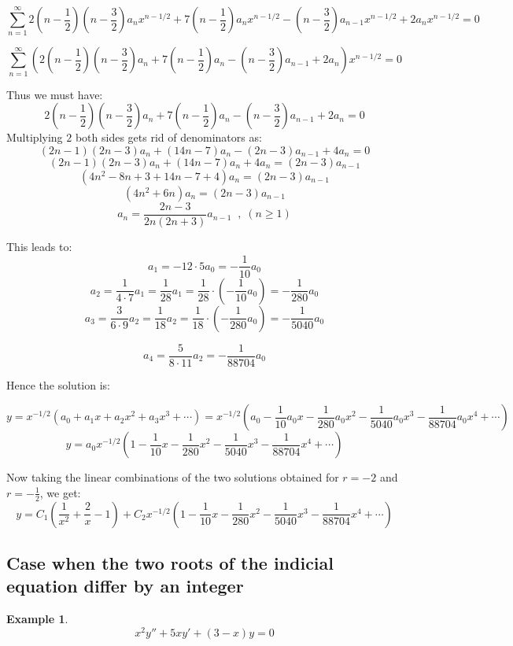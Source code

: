 \documentclass[12pt]{report}
\newtheorem{ex}{Example}[section]
\begin{document}
$$\sum_{n=1}^{\infty} 2\left(n-\frac{1}{2} \right)\left(n-\frac{3}{2} \right) a_n x^{n-1/2} +   7\left(n-\frac{1}{2} \right) a_n x^{n-1/2} -  \left(n-\frac{3}{2} \right) a_{n-1} x^{n-1/2} + 2a_n x^{n-1/2} = 0$$

$$\sum_{n=1}^{\infty} \left( 2\left(n-\frac{1}{2} \right)\left(n-\frac{3}{2} \right) a_n +   7\left(n-\frac{1}{2} \right) a_n -  \left(n-\frac{3}{2} \right) a_{n-1}  + 2a_n \right) x^{n-1/2} = 0$$

Thus we must have:
$$ 2\left(n-\frac{1}{2} \right)\left(n-\frac{3}{2} \right) a_n +   7\left(n-\frac{1}{2} \right) a_n -  \left(n-\frac{3}{2} \right) a_{n-1}  + 2a_n   = 0$$
Multiplying $2$ both sides gets rid of denominators as:
$$ (2n-1)(2n-3)a_n +   (14n-7) a_n -  (2n-3) a_{n-1}  + 4a_n   = 0$$
$$ (2n-1)(2n-3)a_n +   (14n-7) a_n  + 4a_n   =  (2n-3) a_{n-1}$$
$$ \left( 4n^2 -8n + 3 +14n -7 + 4 \right) a_n = (2n-3) a_{n-1}$$
$$ \left( 4n^2 +6n  \right) a_n = (2n-3) a_{n-1}$$
$$ a_n = \frac{2n-3}{2n(2n+3)} a_{n-1} \; \; , \; (n\geq 1)$$

This leads to:
$$ a_1 = {-1}{2\cdot 5} a_0= -\frac{1}{10} a_0 $$
$$ a_2 = \frac{1}{4\cdot 7} a_1 = \frac{1}{28} a_1 = \frac{1}{28} \cdot \left(-\frac{1}{10} a_0 \right) = - \frac{1}{280} a_0 $$
$$a_3 = \frac{3}{6\cdot 9} a_2 =  \frac{1}{18} a_2 = \frac{1}{18}\cdot \left(-\frac{1}{280} a_0 \right) = - \frac{1}{5040} a_0 $$

$$a_4 =  \frac{5}{8\cdot 11 } a_2 = - \frac{1}{88704} a_0 $$


Hence the solution is:

$$y = x^{-1/2} \left( a_0 + a_1 x + a_2 x^2 + a_3 x^3 +\cdots \right) = x^{-1/2} \left( a_0  -\frac{1}{10} a_0 x - \frac{1}{280} a_0 x^2  - \frac{1}{5040} a_0 x^3  - \frac{1}{88704} a_0 x^4 + \cdots \right)$$
$$y = a_0 x^{-1/2} \left(1  -\frac{1}{10} x - \frac{1}{280} x^2  - \frac{1}{5040} x^3  - \frac{1}{88704} x^4 + \cdots  \right) $$

Now taking the linear combinations of the two solutions obtained for $r=-2$ and $r=-\frac{1}{2}$, we get:
$$y= C_1 \left( \frac{1}{x^2} + \frac{2}{x} -1 \right) + C_2 x^{-1/2} \left(1  -\frac{1}{10} x - \frac{1}{280} x^2  - \frac{1}{5040} x^3  - \frac{1}{88704} x^4 + \cdots  \right) $$

\subsection*{Case when the two roots of the indicial equation differ by an integer}

\begin{ex}
$$x^2 y'' + 5xy' + (3-x) y =0$$
\end{ex}
\end{document}
